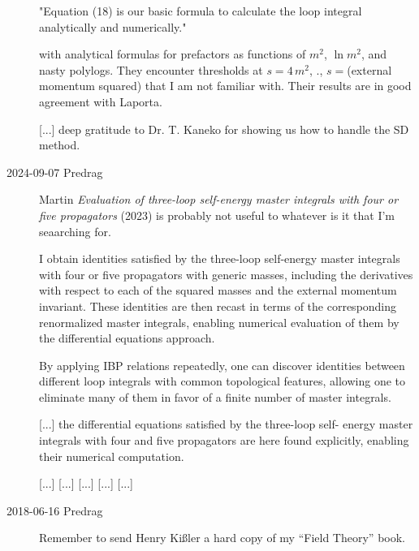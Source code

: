 \begin{description}
"Equation (18) is our basic formula to calculate
the loop integral analytically and numerically."

with analytical formulas for prefactors as functions of $m^2$,  $\ln m^2$,
and nasty polylogs.
They encounter thresholds at $s=4\,m^2$, \etc., $s=$(external momentum squared)
that I am not familiar with.
Their results are in good agreement with Laporta.

[...]
deep gratitude to Dr. T. Kaneko for showing us how to handle the SD method.

\item[2024-09-07 Predrag]
Martin
{\em Evaluation of three-loop self-energy master integrals with four or five propagators}
(2023) is probably not useful to whatever is it that I'm seaarching for.

I obtain identities satisfied by the three-loop self-energy master
integrals with four or five propagators with generic masses, including
the derivatives with respect to each of the squared masses and the
external momentum invariant. These identities are then recast in terms of
the corresponding renormalized master integrals, enabling
numerical evaluation of them by the differential equations approach.

By applying IBP relations repeatedly, %
one can discover identities between different loop integrals with
common topological features, allowing one to eliminate
many of them in favor of a finite number of master
integrals.

[...]
the differential equations satisfied by the three-loop self-
energy master integrals with four and five propagators are here
found explicitly, enabling their numerical computation.

[...]
[...]
[...]
[...]
[...]

\bigskip

\item[2018-06-16 Predrag]
Remember to send Henry Ki{\ss}ler a hard copy of my ``Field Theory''
book.


\end{description}


\printbibliography[heading=subbibintoc,title={References}]
